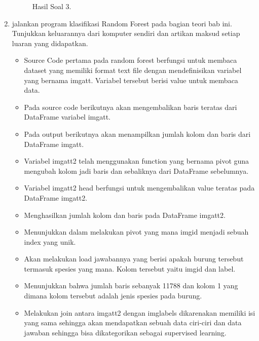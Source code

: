 \begin{enumerate}
\begin{figure}[H]
		\caption{Hasil Soal 3.}
	\end{figure}
	\item jalankan program klasifikasi Random Forest pada bagian teori bab ini. Tunjukkan keluarannya dari komputer sendiri dan artikan maksud setiap luaran yang didapatkan.
	\hfill\break
	\begin{itemize}
		\item Source Code pertama pada random forest berfungsi untuk membaca dataset yang memiliki format text file dengan mendefinisikan variabel yang bernama imgatt. Variabel tersebut berisi value untuk membaca data. 
		
		\item Pada source code berikutnya akan mengembalikan baris teratas dari DataFrame variabel imgatt.
		
		\item Pada output berikutnya akan menampilkan jumlah kolom dan baris dari DataFrame imgatt. 
		
		\item Variabel imgatt2 telah menggunakan function yang bernama pivot guna mengubah kolom jadi baris dan sebaliknya dari DataFrame sebelumnya.
		
		\item Variabel imgatt2 head berfungsi untuk mengembalikan value teratas pada DataFrame imgatt2.
		
		\item Menghasilkan jumlah kolom dan baris pada DataFrame imgatt2.
		
		\item Menunjukkan dalam melakukan pivot yang mana imgid menjadi sebuah index yang unik.
		
		\item Akan melakukan load jawabannya yang berisi apakah burung tersebut termasuk spesies yang mana. Kolom tersebut yaitu imgid dan label.
		
		\item Menunjukkan bahwa jumlah baris sebanyak 11788 dan kolom 1 yang dimana kolom tersebut adalah jenis spesies pada burung.
		
		\item Melakukan join antara imgatt2 dengan imglabels dikarenakan memiliki isi yang sama sehingga akan mendapatkan sebuah data ciri-ciri dan data jawaban sehingga bisa dikategorikan sebagai supervised learning.

\end{itemize}
\end{enumerate}
